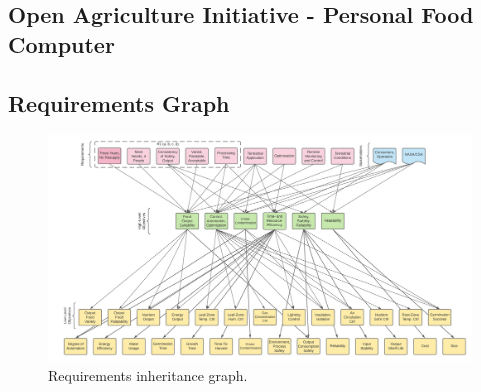 \documentclass{../tex/report}
\begin{document}

\subsection{Open Agriculture Initiative - Personal Food Computer}



\clearpage

\begin{appendices}
\section{Requirements Graph}

\begin{figure}[h]
  \centering
  \includegraphics[width=\textwidth,angle=90,origin=c]{../assets/figures/requirements.png}
  \caption{Requirements inheritance graph.}
  \label{fig:requirements-graph}
\end{figure}

\end{appendices}

\clearpage



\end{document}
